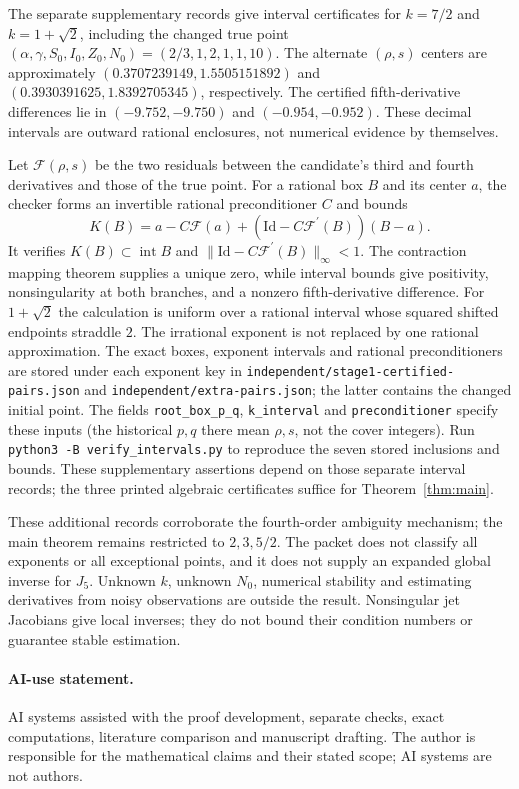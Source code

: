 \documentclass[10pt,a4paper]{article}
\begin{document}
The separate supplementary records give interval certificates for
$k=7/2$ and $k=1+\sqrt2$, including the changed true point
$(\alpha,\gamma,S_0,I_0,Z_0,N_0)=(2/3,1,2,1,1,10)$.
The alternate $(\rho,s)$ centers are approximately
$(0.3707239149,1.5505151892)$ and
$(0.3930391625,1.8392705345)$, respectively. The certified
fifth-derivative differences lie in $(-9.752,-9.750)$ and
$(-0.954,-0.952)$. These decimal intervals are outward rational
enclosures, not numerical evidence by themselves.

Let $\mathcal F(\rho,s)$ be the two residuals between the candidate's
third and fourth derivatives and those of the true point. For a rational
box $B$ and its center $a$, the checker forms an invertible rational
preconditioner $C$ and bounds
\[
K(B)=a-C\mathcal F(a)+(\mathrm{Id}-C\mathcal F^{\prime}(B))(B-a).
\]
It verifies $K(B)\subset\operatorname{int}B$ and
$\|\mathrm{Id}-C\mathcal F^{\prime}(B)\|_\infty<1$. The contraction mapping theorem supplies
a unique zero, while interval bounds give positivity, nonsingularity
at both branches, and a nonzero fifth-derivative difference.
For $1+\sqrt2$ the calculation is uniform over a rational interval
whose squared shifted endpoints straddle $2$. The irrational
exponent is not replaced by one rational approximation.
The exact boxes, exponent intervals and rational preconditioners are
stored under each exponent key in
\texttt{independent/stage1-certified-pairs.json} and
\texttt{independent/extra-pairs.json}; the latter contains the changed
initial point. The fields \texttt{root\_box\_p\_q},
\texttt{k\_interval} and \texttt{preconditioner} specify these inputs
(the historical $p,q$ there mean $\rho,s$, not the cover integers).
Run \texttt{python3 -B verify\_intervals.py} to reproduce the seven
stored inclusions and bounds. These supplementary assertions depend
on those separate interval records; the three printed algebraic
certificates suffice for Theorem~\ref{thm:main}.

These additional records corroborate the fourth-order ambiguity
mechanism; the main theorem remains restricted to $2,3,5/2$.
The packet does not classify all exponents or all exceptional points,
and it does not supply an expanded global inverse for $J_5$.
Unknown $k$, unknown $N_0$, numerical stability and estimating
derivatives from noisy observations are outside the result.
Nonsingular jet Jacobians give local inverses; they do not bound
their condition numbers or guarantee stable estimation.

\paragraph{AI-use statement.}
AI systems assisted with the proof development, separate checks,
exact computations, literature comparison and manuscript drafting.
The author is responsible for the mathematical claims and their
stated scope; AI systems are not authors.
\end{document}
